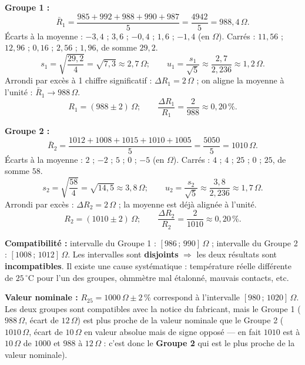 \documentclass[11pt]{article}
\newcounter{popsec}
\newcounter{popsub}
\newcommand{\courssub}[1]{%
  \stepcounter{popsub}%
  \par\vspace{9pt}\noindent{\popxbold\fontsize{11.5}{13}\selectfont\color{popink}{\color{poporange}\thepopsec.\thepopsub}\hspace{6pt}#1}\par\nopagebreak\vspace{4pt}
}
\begin{document}
\begin{corrige}
\textbf{Groupe 1 :}
\[
\bar{R}_1 = \frac{985+992+988+990+987}{5} = \frac{4942}{5} = 988,4\,\Omega.
\]
Écarts à la moyenne : $-3,4$ ; $3,6$ ; $-0,4$ ; $1,6$ ; $-1,4$ (en $\Omega$). Carrés : $11,56$ ; $12,96$ ; $0,16$ ; $2,56$ ; $1,96$, de somme $29,2$.
\[
s_1 = \sqrt{\frac{29,2}{4}} = \sqrt{7,3} \approx 2,7\,\Omega ; \qquad u_1 = \frac{s_1}{\sqrt{5}} \approx \frac{2,7}{2,236} \approx 1,2\,\Omega.
\]
Arrondi par excès à 1 chiffre significatif : $\Delta R_1 = 2\,\Omega$ ; on aligne la moyenne à l'unité : $\bar{R}_1 \to 988\,\Omega$.
\[
\boxed{R_1 = (988 \pm 2)\,\Omega} ; \qquad \frac{\Delta R_1}{R_1} = \frac{2}{988} \approx 0,20\,\%.
\]

\textbf{Groupe 2 :}
\[
\bar{R}_2 = \frac{1012+1008+1015+1010+1005}{5} = \frac{5050}{5} = 1010\,\Omega.
\]
Écarts à la moyenne : $2$ ; $-2$ ; $5$ ; $0$ ; $-5$ (en $\Omega$). Carrés : $4$ ; $4$ ; $25$ ; $0$ ; $25$, de somme $58$.
\[
s_2 = \sqrt{\frac{58}{4}} = \sqrt{14,5} \approx 3,8\,\Omega ; \qquad u_2 = \frac{s_2}{\sqrt{5}} \approx \frac{3,8}{2,236} \approx 1,7\,\Omega.
\]
Arrondi par excès : $\Delta R_2 = 2\,\Omega$ ; la moyenne est déjà alignée à l'unité.
\[
\boxed{R_2 = (1010 \pm 2)\,\Omega} ; \qquad \frac{\Delta R_2}{R_2} = \frac{2}{1010} \approx 0,20\,\%.
\]

\textbf{Compatibilité :} intervalle du Groupe 1 : $[986\,;\,990]\,\Omega$ ; intervalle du Groupe 2 : $[1008\,;\,1012]\,\Omega$. Les intervalles sont \textbf{disjoints} $\Rightarrow$ les deux résultats sont \textbf{incompatibles}. Il existe une cause systématique : température réelle différente de $25\,^\circ\text{C}$ pour l'un des groupes, ohmmètre mal étalonné, mauvais contacts, etc.

\textbf{Valeur nominale :} $R_{25} = 1000\,\Omega \pm 2\,\%$ correspond à l'intervalle $[980\,;\,1020]\,\Omega$. Les deux groupes sont compatibles avec la notice du fabricant, mais le Groupe 1 ($988\,\Omega$, écart de $12\,\Omega$) est plus proche de la valeur nominale que le Groupe 2 ($1010\,\Omega$, écart de $10\,\Omega$ en valeur absolue mais de signe opposé — en fait $1010$ est à $10\,\Omega$ de $1000$ et $988$ à $12\,\Omega$ : c'est donc le \textbf{Groupe 2} qui est le plus proche de la valeur nominale).
\end{corrige}

\courssub{Synthèse des règles d'or}
\end{document}
